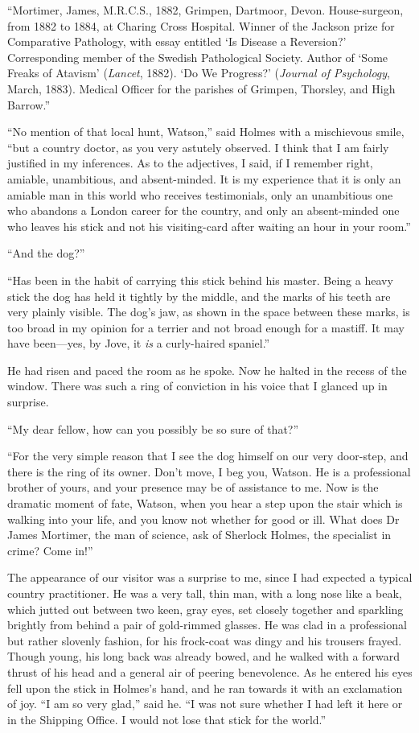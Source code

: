 \documentclass[paper=5.5in:8.5in,BCOR=7mm,twoside,DIV=calc,12pt,usegeometry,openany,chapterprefix,endperiod]{scrbook} %
\begin{document}
\enquote{Mortimer, James, M.R.C.S., 1882, Grimpen, Dartmoor, Dev\-on. House-surgeon, from 1882 to 1884, at Charing Cross Hospital. Winner of the Jackson prize for Comparative Pathology, with essay entitled \enquote{Is Disease a Reversion?} Corresponding member of the Swedish Pathological Society. Author of \enquote{Some Freaks of Atavism} (\textit{Lancet}, 1882). \enquote{Do We Progress?} (\textit{Journal of Psychology}, March, 1883). Medical Officer for the parishes of Grimpen, Thorsley, and High Barrow.}

\enquote{No mention of that local hunt, Watson,} said Holmes with a mischievous smile, \enquote{but a country doctor, as you very astutely observed. I think that I am fairly justified in my inferences. As to the adjectives, I said, if I remember right, amiable, unambitious, and absent-minded. It is my experience that it is only an amiable man in this world who receives testimonials, only an unambitious one who abandons a London career for the country, and only an absent-minded one who leaves his stick and not his visiting-card after waiting an hour in your room.}

\enquote{And the dog?}

\enquote{Has been in the habit of carrying this stick behind his master. Being a heavy stick the dog has held it tightly by the middle, and the marks of his teeth are very plainly visible. The dog's jaw, as shown in the space between these marks, is too broad in my opinion for a terrier and not broad enough for a mastiff. It may have been\nobreakdash---yes, by Jove, it \emph{is} a curly-haired spaniel.}

He had risen and paced the room as he spoke. Now he halted in the recess of the window. There was such a ring of conviction in his voice that I glanced up in surprise.

\enquote{My dear fellow, how can you possibly be so sure of that?}

\enquote{For the very simple reason that I see the dog himself on our very door-step, and there is the ring of its owner. Don't move, I beg you, Watson. He is a professional brother of yours, and your presence may be of assistance to me. Now is the dramatic moment of fate, Watson, when you hear a step upon the stair which is walking into your life, and you know not whether for good or ill. What does Dr James Mortimer, the man of science, ask of Sherlock Holmes, the specialist in crime? Come in!}

The appearance of our visitor was a surprise to me, since I had expected a typical country practitioner. He was a very tall, thin man, with a long nose like a beak, which jutted out between two keen, gray eyes, set closely together and sparkling brightly from behind a pair of gold-rimmed glasses. He was clad in a professional but rather slovenly fashion, for his frock-coat was dingy and his trousers frayed. Though young, his long back was already bowed, and he walked with a forward thrust of his head and a general air of peering benevolence. As he entered his eyes fell upon the stick in Holmes's hand, and he ran towards it with an exclamation of joy. \enquote{I am so very glad,} said he. \enquote{I was not sure whether I had left it here or in the Shipping Office. I would not lose that stick for the world.}
\end{document}
